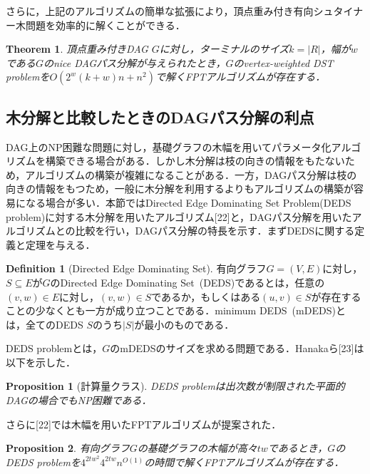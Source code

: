 \documentclass[master]{kuisthesis}		%
\theoremstyle{plain}
\newtheorem{theorem}{Theorem}
\newtheorem{proposition}{Proposition}
\theoremstyle{definition}
\newtheorem{definition*}{Definition}
\begin{document}
さらに，上記のアルゴリズムの簡単な拡張により，頂点重み付き有向シュタイナー木問題を効率的に解くことができる．

\begin{theorem}
    頂点重み付きDAG $G$に対し，ターミナルのサイズ$k=|R|$，幅が$w$である$G$のnice DAGパス分解が与えられたとき，$G$のvertex-weighted DST problemを$O(2^w(k+w)n + n^2)$で解くFPTアルゴリズムが存在する．
\end{theorem}















\subsection{木分解と比較したときのDAGパス分解の利点}

DAG上のNP困難な問題に対し，基礎グラフの木幅を用いてパラメータ化アルゴリズムを構築できる場合がある．しかし木分解は枝の向きの情報をもたないため，アルゴリズムの構築が複雑になることがある．一方，DAGパス分解は枝の向きの情報をもつため，一般に木分解を利用するよりもアルゴリズムの構築が容易になる場合が多い．本節ではDirected Edge Dominating Set Problem(DEDS problem)に対する木分解を用いたアルゴリズム[22]と，DAGパス分解を用いたアルゴリズムとの比較を行い，DAGパス分解の特長を示す．まずDEDSに関する定義と定理を与える．

\begin{definition*}[Directed Edge Dominating Set]
    有向グラフ$G=(V, E)$に対し，$S \subseteq E$が$G$のDirected Edge Dominating Set\ (DEDS)であるとは，任意の$(v, w) \in E$に対し，$(v, w) \in S$であるか，もしくはある$(u, v) \in S$が存在することの少なくとも一方が成り立つことである．minimum DEDS\ (mDEDS)とは，全てのDEDS $S$のうち$|S|$が最小のものである．
\end{definition*}

DEDS problemとは，$G$のmDEDSのサイズを求める問題である．Hanakaら[23]は以下を示した．

\begin{proposition}[計算量クラス]
    DEDS problemは出次数が制限された平面的DAGの場合でもNP困難である．
\end{proposition}

さらに[22]では木幅を用いたFPTアルゴリズムが提案された．

\begin{proposition}
    有向グラフ$G$の基礎グラフの木幅が高々$tw$であるとき，$G$のDEDS problemを$4^{2tw^2}4^{2tw}n^{O(1)}$の時間で解くFPTアルゴリズムが存在する．
\end{proposition}
\end{document}
